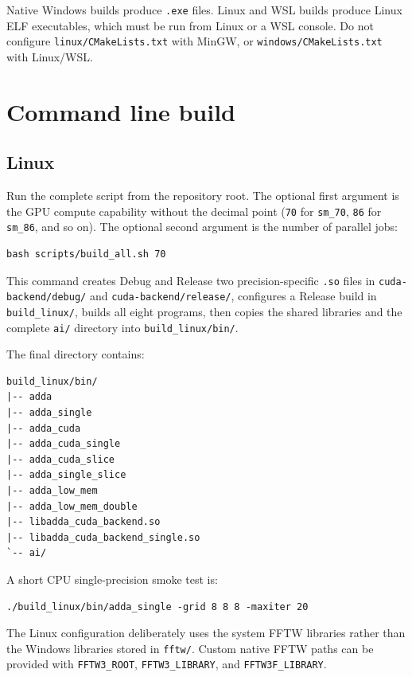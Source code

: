 \documentclass[11pt,a4paper]{article}
\newcommand{\code}[1]{\nolinkurl{#1}}
\begin{document}
Native Windows builds produce \code{.exe} files. Linux and WSL builds produce
Linux ELF executables, which must be run from Linux or a WSL console. Do not
configure \code{linux/CMakeLists.txt} with MinGW, or
\code{windows/CMakeLists.txt} with Linux/WSL.

\section{Command line build}

\subsection{Linux}

Run the complete script from the repository root. The optional first argument
is the GPU compute capability without the decimal point (\code{70} for
\code{sm_70}, \code{86} for \code{sm_86}, and so on). The optional second
argument is the number of parallel jobs:

\begin{lstlisting}
bash scripts/build_all.sh 70
\end{lstlisting}

This command creates Debug and Release two precision-specific \code{.so} files
in \code{cuda-backend/debug/} and \code{cuda-backend/release/}, configures a
Release build in \code{build_linux/}, builds all eight programs, then copies the shared libraries and the complete
\code{ai/} directory into \code{build_linux/bin/}.

The final directory contains:

\begin{lstlisting}
build_linux/bin/
|-- adda
|-- adda_single
|-- adda_cuda
|-- adda_cuda_single
|-- adda_cuda_slice
|-- adda_single_slice
|-- adda_low_mem
|-- adda_low_mem_double
|-- libadda_cuda_backend.so
|-- libadda_cuda_backend_single.so
`-- ai/
\end{lstlisting}

A short CPU single-precision smoke test is:

\begin{lstlisting}
./build_linux/bin/adda_single -grid 8 8 8 -maxiter 20
\end{lstlisting}

The Linux configuration deliberately uses the system FFTW libraries rather
than the Windows libraries stored in \code{fftw/}. Custom native FFTW paths can
be provided with \code{FFTW3_ROOT}, \code{FFTW3_LIBRARY}, and
\code{FFTW3F_LIBRARY}.
\end{document}
